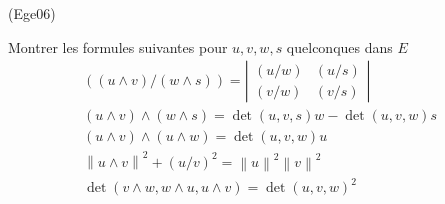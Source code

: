 \begin{tiny}(Ege06)\end{tiny}
Montrer les formules suivantes pour $u,v,w,s$ quelconques dans $E$%
\begin{align*}
\left( (u\wedge v) / (w\wedge s) \right) =\left|
\begin{array}{cc}
(u/ w) & (u/ s) \\
(v/ w) & (v/ s)
\end{array}
\right|  \\
(u\wedge v)\wedge (w\wedge s) =\det(u,v,s)w-\det(u,v,w)s \\
(u\wedge v)\wedge (u\wedge w) =\det(u,v,w)u \\
\left\| u\wedge v\right\| ^{2}+(u/ v)^{2} =\left\| u\right\|
^{2}\left\| v\right\| ^{2} \\
\det(v\wedge w,w\wedge u,u\wedge v) =\det(u,v,w)^{2}
\end{align*}